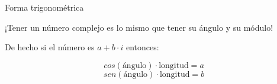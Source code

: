 \documentclass[10pt]{beamer}
\newcommand*\circled[1]{\tikz[baseline=(char.base)]{
   \node[shape=circle,color=red,draw,inner sep=1pt] (char) {#1};}}
\def\ii{\textbf{i}}
\begin{document}

\begin{frame}{Forma trigonométrica}

¡Tener un número complejo es lo mismo que tener su ángulo y su módulo!
	
	
	
	De hecho si el número es $a + b\cdot i$ entonces:
	
	$$cos(\text{ángulo}) \cdot \text{longitud} = a$$
	$$sen(\text{ángulo}) \cdot \text{longitud} = b$$
	

\end{frame}
\end{document}
